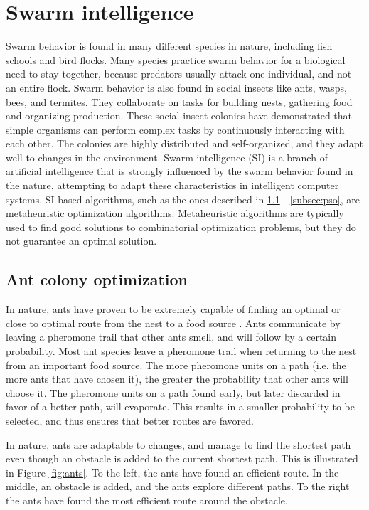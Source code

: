 \section{Swarm intelligence}
\label{sec:swarmIntelligence}
Swarm behavior is found in many different species in nature, including fish schools and bird flocks. Many species practice swarm behavior for a biological need to stay together, because predators usually attack one individual, and not an entire flock. Swarm behavior is also found in social insects like ants, wasps, bees, and termites. They collaborate on tasks for building nests, gathering food and organizing production. These social insect colonies have demonstrated that simple organisms can perform complex tasks by continuously interacting with each other. The colonies are highly distributed and self-organized, and they adapt well to changes in the environment. Swarm intelligence (SI) \citep{beni89} is a branch of artificial intelligence that is strongly influenced by the swarm behavior found in the nature, attempting to adapt these characteristics in intelligent computer systems. SI based algorithms, such as the ones described in \ref{subsec:aco} - \ref{subsec:pso}, are metaheuristic optimization algorithms. Metaheuristic algorithms are typically used to find good solutions to combinatorial optimization problems, but they do not guarantee an optimal solution.  

\subsection{Ant colony optimization}
\label{subsec:aco}
In nature, ants have proven to be extremely capable of finding an optimal or close to optimal route from the nest to a food source \citep{deneubourg90}. Ants communicate by leaving a pheromone trail that other ants smell, and will follow by a certain probability. Most ant species leave a pheromone trail when returning to the nest from an important food source. The more pheromone units on a path (i.e. the more ants that have chosen it), the greater the probability that other ants will choose it. The pheromone units on a path found early, but later discarded in favor of a better path, will evaporate. This results in a smaller probability to be selected, and thus ensures that better routes are favored.

In nature, ants are adaptable to changes, and manage to find the shortest path even though an obstacle is added to the current shortest path. This is illustrated in Figure \ref{fig:ants}. To the left, the ants have found an efficient route. In the middle, an obstacle is added, and the ants explore different paths. To the right the ants have found the most efficient route around the obstacle.

